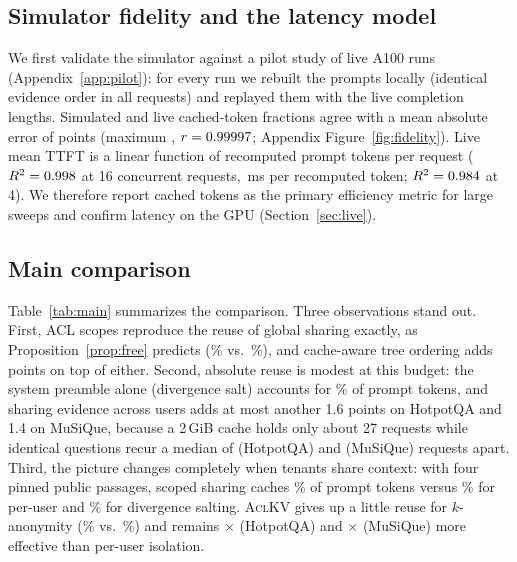 \documentclass[11pt]{article}
\newcommand{\sysname}{\textsc{AclKV}\xspace}
\begin{document}
\subsection{Simulator fidelity and the latency model}
\label{sec:fidelity}
We first validate the simulator against a pilot study of \numfidN{} live A100 runs (Appendix~\ref{app:pilot}): for every run we rebuilt the prompts locally (identical evidence order in all requests) and replayed them with the live completion lengths. Simulated and live cached-token fractions agree with a mean absolute error of \numfidMAE{} points (maximum \numfidMax, $r=0.99997$; Appendix Figure~\ref{fig:fidelity}). Live mean TTFT is a linear function of recomputed prompt tokens per request ($R^2=0.998$ at 16 concurrent requests, \numttftSlopeSixteen{}\,ms per recomputed token; $R^2=0.984$ at 4). We therefore report cached tokens as the primary efficiency metric for large sweeps and confirm latency on the GPU (Section~\ref{sec:live}).

\subsection{Main comparison}
\label{sec:main}

\begin{table}[t]
\centering
\small

\caption{Cached prompt tokens at a 2\,GiB KV budget (mean $\pm$ s.d.\ over three workload seeds; \emph{pinned}: one seed), relative reuse versus per-user isolation on HotpotQA, and the fraction of insider probes that single out one colleague. $^\dagger$Shared system preamble. Global sharing is insecure and shown as an upper bound; it also leaks to bypass clients (\numbypassGlobal{} honest blocks hit), unlike every scoped policy (0).}
\label{tab:main}
\end{table}

Table~\ref{tab:main} summarizes the comparison. Three observations stand out. First, ACL scopes reproduce the reuse of global sharing exactly, as Proposition~\ref{prop:free} predicts (\numhqACLScope\% vs.\ \numhqGlobal\%), and cache-aware tree ordering adds \numtreeGainHQ{} points on top of either. Second, absolute reuse is modest at this budget: the system preamble alone (divergence salt) accounts for \numhqDivergence\% of prompt tokens, and sharing evidence across users adds at most another 1.6 points on HotpotQA and 1.4 on MuSiQue, because a 2\,GiB cache holds only about 27 requests while identical questions recur a median of \numrepeatGapHQ{} (HotpotQA) and \numrepeatGapMQ{} (MuSiQue) requests apart. Third, the picture changes completely when tenants share context: with four pinned public passages, scoped sharing caches \numpinACLScope\% of prompt tokens versus \numpinPerUser\% for per-user and \numpinDivergence\% for divergence salting. \sysname gives up a little reuse for $k$-anonymity (\numhqACLKV\% vs.\ \numhqACLScopeTree\%) and remains \numaclkvVsPerUserHQ$\times$ (HotpotQA) and \numaclkvVsPerUserMQ$\times$ (MuSiQue) more effective than per-user isolation.
\end{document}
